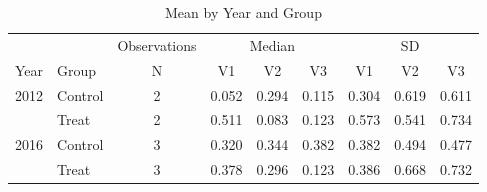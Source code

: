 \documentclass[]{article}
\begin{document}

\pagebreak

\begin{table}[ht]
\centering
\begin{tabular}{@{\extracolsep{4pt}}llccccccc}
\toprule   
{} & {} & {Observations} & \multicolumn{3}{c}{Median}  & \multicolumn{3}{c}{SD}\\
 \cmidrule{3-3} 
 \cmidrule{4-6} 
 \cmidrule{7-9} 
 Year & Group & N & V1 & V2 & V3 & V1 & V2 & V3 \\ 
\midrule
2012  & Control & 2 & 0.052 & 0.294 & 0.115 & 0.304 & 0.619 & 0.611 \\ 
  & Treat & 2 & 0.511 & 0.083 & 0.123 & 0.573 & 0.541 & 0.734 \\ 
2016  & Control & 3 & 0.320 & 0.344 & 0.382 & 0.382 & 0.494 & 0.477 \\ 
  & Treat & 3 & 0.378 & 0.296 & 0.123 & 0.386 & 0.668 & 0.732 \\ 
\bottomrule
\end{tabular}
\caption{Mean by Year and Group} 
\end{table}
\end{document}
